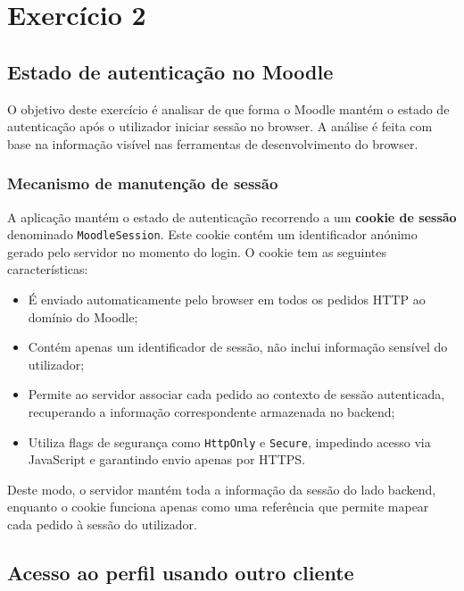 % 
%  
%
\chapter{Exercício 2}
\label{cha:exercise_2}

\section{Estado de autenticação no Moodle}

O objetivo deste exercício é analisar de que forma o Moodle mantém o estado de autenticação após o utilizador iniciar sessão no browser. A análise é feita com base na informação visível nas ferramentas de desenvolvimento do browser.

\subsection*{Mecanismo de manutenção de sessão}

A aplicação mantém o estado de autenticação recorrendo a um \textbf{cookie de sessão} denominado \texttt{MoodleSession}. Este cookie contém um identificador anónimo gerado pelo servidor no momento do login. O cookie tem as seguintes características:

\begin{itemize} \item É enviado automaticamente pelo browser em todos os pedidos HTTP ao domínio do Moodle; \item Contém apenas um identificador de sessão, não inclui informação sensível do utilizador; \item Permite ao servidor associar cada pedido ao contexto de sessão autenticada, recuperando a informação correspondente armazenada no backend; \item Utiliza flags de segurança como \texttt{HttpOnly} e \texttt{Secure}, impedindo acesso via JavaScript e garantindo envio apenas por HTTPS. \end{itemize}

Deste modo, o servidor mantém toda a informação da sessão do lado backend, enquanto o cookie funciona apenas como uma referência que permite mapear cada pedido à sessão do utilizador.

\section{Acesso ao perfil usando outro cliente}

